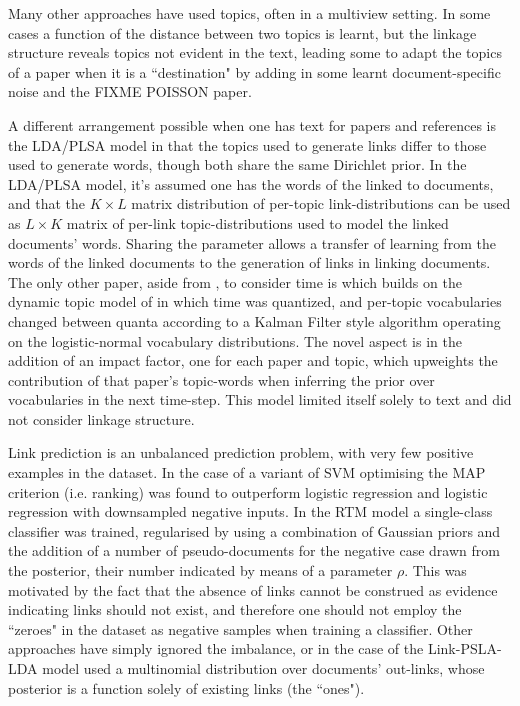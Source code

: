 Many other approaches have used topics, often in a multiview setting. In some cases a function of the distance between two topics is learnt\cite{Chang2009a}\cite{Chang2010a}, but the linkage structure reveals topics not evident in the text, leading some to adapt the topics of a paper when it is a ``destination" by adding in some learnt document-specific noise\cite{Neiswanger2014} and the FIXME POISSON paper.

A different arrangement possible when one has text for papers and references is the LDA/PLSA model\cite{Nallapati2008}\cite{Nallapati2008a} in that the topics used to generate links differ to those used to generate words, though both share the same Dirichlet prior. In the LDA/PLSA model, it's assumed one has the words of the linked to documents, and that the $K \times L$ matrix distribution of per-topic link-distributions can be used as $L \times K$ matrix of per-link topic-distributions used to model the linked documents' words. Sharing the parameter allows a transfer of learning from the words of the linked documents to the generation of links in linking documents.
The only other paper, aside from \cite{Bethard2010}, to consider time is \cite{Gerrish2010} which builds on the dynamic topic model of \cite{Blei2006a} in which time was quantized, and per-topic vocabularies changed between quanta according to a Kalman Filter style algorithm operating on the logistic-normal vocabulary distributions. The novel aspect is in the addition of an impact factor, one for each paper and topic, which upweights the contribution of that paper's topic-words when inferring the prior over vocabularies in the next time-step. This model limited itself solely to text and did not consider linkage structure.

Link prediction is an unbalanced prediction problem, with very few positive examples in the dataset. In the case of \cite{Bethard2010} a variant of SVM optimising the MAP criterion\cite{Yue2007} (i.e. ranking) was found to outperform logistic regression and logistic regression with downsampled negative inputs. In the RTM model\cite{Chang2009a}\cite{Chang2010a} a single-class classifier was trained, regularised by using a combination of Gaussian priors and the addition of a number of pseudo-documents for the negative case drawn from the posterior, their number indicated by means of a parameter $\rho$. This was motivated by the fact that the absence of links cannot be construed as evidence indicating links should not exist, and therefore one should not employ the ``zeroes" in the dataset as negative samples when training a classifier. Other approaches have simply ignored the imbalance, or in the case of the Link-PSLA-LDA model\cite{Nallapati2008}\cite{Nallapati2008a} used a multinomial distribution over documents' out-links, whose posterior is a function solely of existing links (the ``ones").


